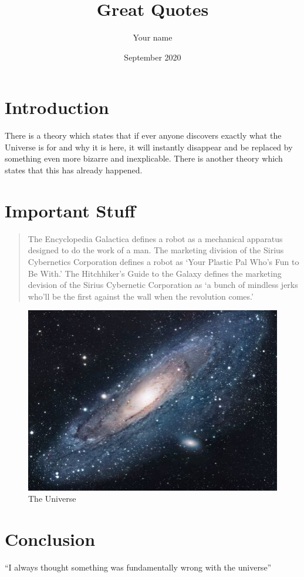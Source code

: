 \documentclass{article}
\title{Great Quotes}
\author{Your name}
\date{September 2020}
\begin{document}
\maketitle

\section{Introduction}
There is a theory which states that if ever anyone discovers exactly what the Universe is for and why it is here, it will instantly disappear and be replaced by something even more bizarre and inexplicable.
There is another theory which states that this has already happened.

\section{Important Stuff}

\begin{quote}
The Encyclopedia Galactica defines a robot as a mechanical apparatus designed to do the work of a man. The marketing division of the Sirius Cybernetics Corporation defines a robot as `Your Plastic Pal Who's Fun to Be With.' The Hitchhiker's Guide to the Galaxy defines the marketing devision of the Sirius Cybernetic Corporation as `a bunch of mindless jerks who'll be the first against the wall when the revolution comes.'
\end{quote}

\begin{figure}[h!]
\centering
\includegraphics[scale=1.7]{universe}
\caption{The Universe}
\label{fig:universe}
\end{figure}

\section{Conclusion}
``I always thought something was fundamentally wrong with the universe'' \citep{adams1995hitchhiker}



\end{document}
